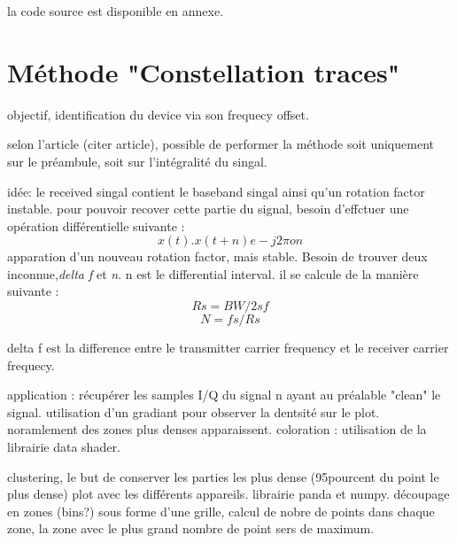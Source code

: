 la code source est disponible en annexe.


\section{Méthode "Constellation traces"}

objectif, identification du device via son frequecy offset.

selon l'article (citer article), possible de performer la méthode soit uniquement sur le  préambule, soit sur l'intégralité du singal. 

idée: le received singal contient le baseband singal ainsi qu'un rotation factor instable. pour pouvoir recover cette partie du signal, besoin d'effctuer une opération différentielle suivante : $$ x(t) . x(t+n) e -j2\pi on $$
apparation d'un nouveau rotation factor, mais stable. Besoin de trouver deux inconnue,\textit{delta f} et \textit{n}. n est le differential interval. il se calcule de la manière suivante : $$ Rs = BW / 2sf $$ 
$$ N = fs / Rs $$

delta f est la difference entre le transmitter carrier frequency et le receiver carrier frequecy.

application : récupérer les samples I/Q du signal n ayant au préalable "clean" le signal. utilisation d'un gradiant pour observer la dentsité sur le plot. noramlement des zones plus denses apparaissent.
coloration : utilisation de la librairie data shader. 


clustering, le but de conserver les parties les plus dense (95pourcent du point le plus dense) plot avec les différents appareils.
librairie panda et numpy. découpage en zones (bins?) sous forme d'une grille, calcul de nobre de points dans chaque zone, la zone avec le plus grand nombre de point sers de maximum. 
